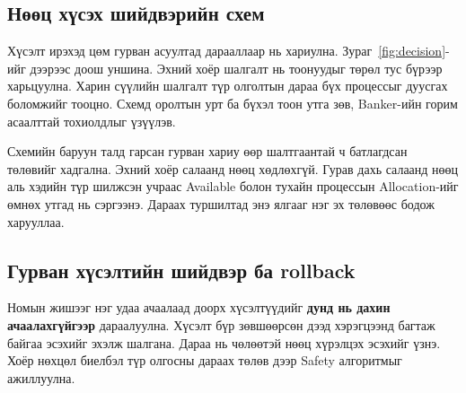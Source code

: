 \subsection{Нөөц хүсэх шийдвэрийн схем}
Хүсэлт ирэхэд цөм гурван асуултад дарааллаар нь хариулна. Зураг~\ref{fig:decision}-ийг дээрээс доош уншина. Эхний хоёр шалгалт нь тоонуудыг төрөл тус бүрээр харьцуулна. Харин сүүлийн шалгалт түр олголтын дараа бүх процессыг дуусгах боломжийг тооцно. Схемд оролтын урт ба бүхэл тоон утга зөв, Banker-ийн горим асаалттай тохиолдлыг үзүүлэв.

\begin{center}
\label{fig:decision}
\end{center}

Схемийн баруун талд гарсан гурван хариу өөр шалтгаантай ч батлагдсан төлөвийг хадгална. Эхний хоёр салаанд нөөц хөдлөхгүй. Гурав дахь салаанд нөөц аль хэдийн түр шилжсэн учраас Available болон тухайн процессын Allocation-ийг өмнөх утгад нь сэргээнэ. Дараах туршилтад энэ ялгааг нэг эх төлөвөөс бодож харууллаа.
\newpage
\subsection{Гурван хүсэлтийн шийдвэр ба rollback}
Номын жишээг нэг удаа ачаалаад доорх хүсэлтүүдийг \textbf{дунд нь дахин ачаалахгүйгээр} дараалуулна. Хүсэлт бүр зөвшөөрсөн дээд хэрэгцээнд багтаж байгаа эсэхийг эхэлж шалгана. Дараа нь чөлөөтэй нөөц хүрэлцэх эсэхийг үзнэ. Хоёр нөхцөл биелбэл түр олгосны дараах төлөв дээр Safety алгоритмыг ажиллуулна.

